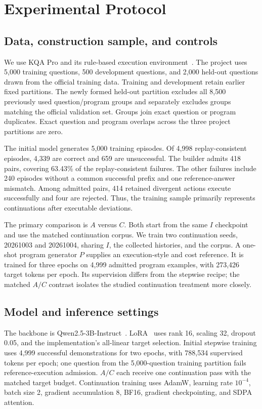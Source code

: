 \section{Experimental Protocol}

\subsection{Data, construction sample, and controls}

We use KQA Pro and its rule-based execution environment~\cite{cao2022kqapro}. The project uses 5,000 training questions, 500 development questions, and 2,000 held-out questions drawn from the official training data. Training and development retain earlier fixed partitions. The newly formed held-out partition excludes all 8,500 previously used question/program groups and separately excludes groups matching the official validation set. Groups join exact question or program duplicates. Exact question and program overlaps across the three project partitions are zero.

The initial model generates 5,000 training episodes. Of 4,998 replay-consistent episodes, 4,339 are correct and 659 are unsuccessful. The builder admits 418 pairs, covering 63.43\% of the replay-consistent failures. The other failures include 240 episodes without a common successful prefix and one reference-answer mismatch. Among admitted pairs, 414 retained divergent actions execute successfully and four are rejected. Thus, the training sample primarily represents continuations after executable deviations.

The primary comparison is $A$ versus $C$. Both start from the same $I$ checkpoint and use the matched continuation corpus. We train two continuation seeds, 20261003 and 20261004, sharing $I$, the collected histories, and the corpus. A one-shot program generator $P$ supplies an execution-style and cost reference. It is trained for three epochs on 4,999 admitted program examples, with 273,426 target tokens per epoch. Its supervision differs from the stepwise recipe; the matched $A/C$ contrast isolates the studied continuation treatment more closely.

\subsection{Model and inference settings}

The backbone is Qwen2.5-3B-Instruct~\cite{qwen2024qwen25}. LoRA~\cite{hu2022lora} uses rank 16, scaling 32, dropout 0.05, and the implementation's all-linear target selection. Initial stepwise training uses 4,999 successful demonstrations for two epochs, with 788,534 supervised tokens per epoch; one question from the 5,000-question training partition fails reference-execution admission. $A/C$ each receive one continuation pass with the matched target budget. Continuation training uses AdamW, learning rate $10^{-4}$, batch size 2, gradient accumulation 8, BF16, gradient checkpointing, and SDPA attention.

